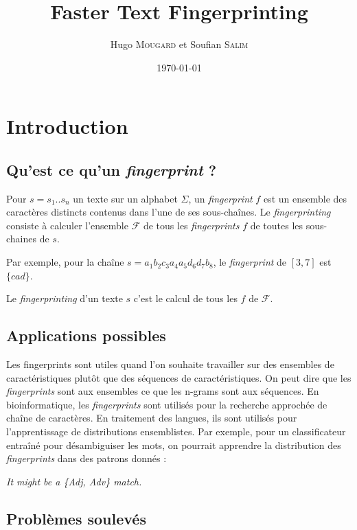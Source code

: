 \documentclass[a4paper]{article}
\title{Faster Text Fingerprinting}
\author{Hugo \textsc{Mougard} et Soufian \textsc{Salim}}
\date{\today}
\begin{document}
\maketitle

\tableofcontents

\section{Introduction}

\subsection{Qu'est ce qu'un \emph{fingerprint} ?}

Pour $s = s_{1} .. s_{n}$ un texte sur un alphabet $\Sigma$, un \textit{fingerprint} $f$ est un ensemble des caractères distincts contenus dans l'une de ses sous-chaînes. Le \emph{fingerprinting} consiste à calculer l'ensemble $\mathcal{F}$ de tous les \emph{fingerprints} $f$ de toutes les sous-chaines de $s$.  \newline

Par exemple, pour la chaîne $s = a_{1} b_{2} c_{3} a_{4} a_{5} d_{6} d_{7} b_{8}$, le \emph{fingerprint} de $[3,7]$ est $\{cad\}$. \newline

Le \emph{fingerprinting} d'un texte $s$ c'est le calcul de tous les $f$ de $\mathcal{F}$.

\subsection{Applications possibles}

Les fingerprints sont utiles quand l'on souhaite travailler sur des ensembles de caractéristiques plutôt que des séquences de caractéristiques. On peut dire que les \emph{fingerprints} sont aux ensembles ce que les n-grams sont aux séquences. En bioinformatique, les \emph{fingerprints} sont utilisés pour la recherche approchée de chaîne de caractères. En traitement des langues, ils sont utilisés pour l'apprentissage de distributions ensemblistes. Par exemple, pour un classificateur entraîné pour désambiguiser les mots, on pourrait apprendre la distribution des \emph{fingerprints} dans des patrons donnés : \newline

\emph{It might be a \{Adj, Adv\} match.}

\subsection{Problèmes soulevés}
\end{document}
